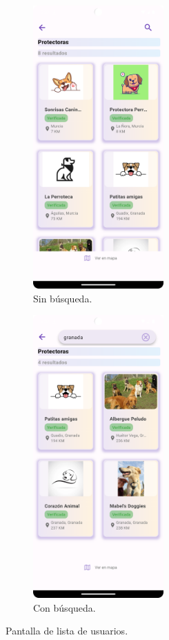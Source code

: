\documentclass[a4paper, 12pt]{article}
\begin{document}
\begin{figure}[H]
   	\begin{subfigure}{0.48\textwidth}
		\begin{center}
			{\includegraphics[width=5cm]{app/UserList.png}\par}
			\caption{Sin búsqueda.}
		\end{center}  
	\end{subfigure}\hfill
   	\begin{subfigure}{0.48\textwidth}
		\begin{center}
			{\includegraphics[width=5cm]{app/UserListSearch.png}\par}
			\caption{Con búsqueda.}
		\end{center}  
	\end{subfigure}\hfill
	\caption{Pantalla de lista de usuarios.}
\end{figure}
\end{document}
